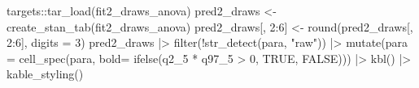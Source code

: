 \documentclass[
  11pt,
  letterpaper,
  DIV=11,
  numbers=noendperiod]{scrartcl}
\newenvironment{Shaded}{}{}
\newcommand{\AttributeTok}[1]{\textcolor[rgb]{0.84,0.23,0.29}{#1}}
\newcommand{\ConstantTok}[1]{\textcolor[rgb]{0.00,0.36,0.77}{#1}}
\newcommand{\DecValTok}[1]{\textcolor[rgb]{0.00,0.36,0.77}{#1}}
\newcommand{\FunctionTok}[1]{\textcolor[rgb]{0.44,0.26,0.76}{#1}}
\newcommand{\NormalTok}[1]{\textcolor[rgb]{0.14,0.16,0.18}{#1}}
\newcommand{\OtherTok}[1]{\textcolor[rgb]{0.44,0.26,0.76}{#1}}
\newcommand{\SpecialCharTok}[1]{\textcolor[rgb]{0.00,0.36,0.77}{#1}}
\newcommand{\StringTok}[1]{\textcolor[rgb]{0.01,0.18,0.38}{#1}}
\begin{document}
\begin{Shaded}
\begin{Highlighting}[]

\NormalTok{targets}\SpecialCharTok{::}\FunctionTok{tar\_load}\NormalTok{(fit2\_draws\_anova)}
\NormalTok{pred2\_draws }\OtherTok{\textless{}{-}} \FunctionTok{create\_stan\_tab}\NormalTok{(fit2\_draws\_anova)}
\NormalTok{pred2\_draws[, }\DecValTok{2}\SpecialCharTok{:}\DecValTok{6}\NormalTok{] }\OtherTok{\textless{}{-}} \FunctionTok{round}\NormalTok{(pred2\_draws[, }\DecValTok{2}\SpecialCharTok{:}\DecValTok{6}\NormalTok{], }\AttributeTok{digits =} \DecValTok{3}\NormalTok{)}
\NormalTok{pred2\_draws }\SpecialCharTok{|\textgreater{}}
  \FunctionTok{filter}\NormalTok{(}\SpecialCharTok{!}\FunctionTok{str\_detect}\NormalTok{(para, }\StringTok{"raw"}\NormalTok{)) }\SpecialCharTok{|\textgreater{}}
  \FunctionTok{mutate}\NormalTok{(}\AttributeTok{para =} \FunctionTok{cell\_spec}\NormalTok{(para, }\AttributeTok{bold=} \FunctionTok{ifelse}\NormalTok{(q2\_5 }\SpecialCharTok{*}\NormalTok{ q97\_5 }\SpecialCharTok{\textgreater{}} \DecValTok{0}\NormalTok{, }\ConstantTok{TRUE}\NormalTok{, }\ConstantTok{FALSE}\NormalTok{))) }\SpecialCharTok{|\textgreater{}}
  \FunctionTok{kbl}\NormalTok{() }\SpecialCharTok{|\textgreater{}}
  \FunctionTok{kable\_styling}\NormalTok{()}
\end{Highlighting}
\end{Shaded}
\end{document}
